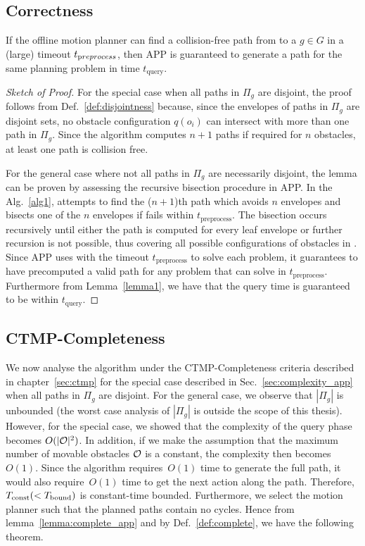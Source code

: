 \documentclass[a4paper]{report}
\begin{document}
\subsection{Correctness}
\begin{lemma}
\label{lemma:complete_app}
If the offline motion planner \calP can find a collision-free path from \Sstart to a $g \in G$ in a (large) timeout $t_{\textrm preprocess}$, then APP is guaranteed to generate a path for the same planning problem in time $t_{\textrm {query}}$.
\end{lemma}
\begin{proof}[Sketch of Proof]
For the special case when all paths in $\Pi_g$ are disjoint, the proof follows from Def.~\ref{def:disjointness} because, since the envelopes of paths in $\Pi_g$ are disjoint sets, no obstacle configuration $q(o_i)$ can intersect with more than one path in $\Pi_g$. Since the algorithm computes $n+1$ paths if required for $n$ obstacles, at least one path is collision free.

For the general case where not all paths in $\Pi_g$ are necessarily disjoint, the lemma can be proven by assessing the recursive bisection procedure in APP. In the Alg.~\ref{alg1}, \calP attempts to find the ($n+1$)th path which avoids $n$ envelopes and bisects one of the $n$ envelopes if \calP fails within $t_{\textrm {preprocess}}$. The bisection occurs recursively until either the path is computed for every leaf envelope or further recursion is not possible, thus covering all possible configurations of obstacles in \calO. Since APP uses \calP with the timeout $t_{\textrm {preprocess}}$ to solve each problem, it guarantees to have precomputed a valid path for any problem that \calP can solve in $t_{\textrm {preprocess}}$.
Furthermore from Lemma~\ref{lemma1}, we have that the query time is guaranteed to be within $t_{\textrm {query}}$.
\end{proof}

\subsection{CTMP-Completeness}
We now analyse the algorithm under the CTMP-Completeness criteria described in chapter~\ref{sec:ctmp} for the special case described in Sec.~\ref{sec:complexity_app} when all paths in $\Pi_g$ are disjoint. For the general case, we observe that $|\Pi_g|$ is unbounded (the worst case analysis of $|\Pi_g|$ is outside the scope of this thesis). However, for the special case, we showed that the complexity of the query phase becomes $O(|\mathcal{O}|^2)$. In addition, if we make the assumption that the maximum number of movable obstacles $\mathcal{O}$ is a constant, the complexity then becomes $O(1)$.
%
Since the algorithm requires~$O(1)$ time to generate the full path, it would also require~$O(1)$ time to get the next action along the path. Therefore, $T_\textrm{const} (< T_{\textrm{bound}})$ is constant-time bounded. Furthermore, we select the motion planner \calP such that the planned paths contain no cycles. Hence from lemma~\ref{lemma:complete_app} and by Def.~\ref{def:complete}, we have the following theorem.
\end{document}
